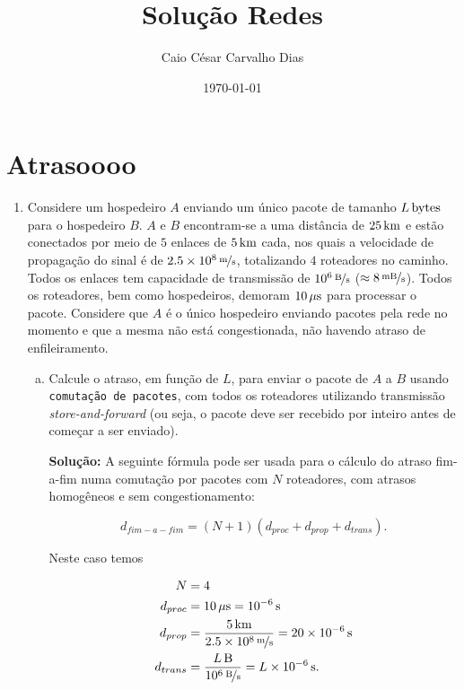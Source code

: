 \documentclass{article}
\title{Solução Redes}
\author{Caio César Carvalho Dias}
\date{\today}
\begin{document}
\maketitle

\section*{Atrasoooo}
\begin{enumerate}
\item 
Considere um hospedeiro $A$ enviando um único pacote de tamanho $\unit[L]{bytes}$ para o hospedeiro $B$. $A$ e $B$ encontram-se a uma distância de $\unit[25]{km}$ e estão conectados por meio de $5$ enlaces de $\unit[5]{km}$ cada, nos quais a velocidade de propagação do sinal é de $\unitfrac[2.5 \times 10^8]{m}{s}$, totalizando $4$ roteadores no caminho. Todos os enlaces tem capacidade de transmissão de $\unitfrac[10^6]{B}{s}$ ($\approx \unitfrac[8]{mB}{s}$). Todos os roteadores, bem como hospedeiros, demoram $\unit[10]{\mu s}$ para processar o pacote. Considere que $A$ é o único hospedeiro enviando pacotes pela rede no momento e que a mesma não está congestionada, não havendo atraso de enfileiramento.

\begin{enumerate}[a)]
\item Calcule o atraso, em função de $L$, para enviar o pacote de $A$ a $B$ usando \texttt{comutação de pacotes}, com todos os roteadores utilizando transmissão \textit{store-and-forward} (ou seja, o pacote deve ser recebido por inteiro antes de começar a ser enviado).

\begin{addmargin}[0.5in]{0.5in}
\par \textbf{Solução:} A seguinte fórmula pode ser usada para o cálculo do atraso fim-a-fim numa comutação por pacotes com $N$ roteadores, com atrasos homogêneos e sem congestionamento:

$$d_{fim-a-fim} = (N + 1)(d_{proc} + d_{prop} + d_{trans}).$$

Neste caso temos

\begin{equation} \label{eq1}
\begin{split}
N & = 4 \\
d_{proc} & = \unit[10]{\mu s} = \unit[10^{-6}]{s}\\
d_{prop} & = \frac{\unit[5]{km}}{\unitfrac[2.5 \times 10^8]{m}{s}} = \unit[20 \times 10^{-6}]{s}\\
d_{trans} & = \frac{\unit[L]{B}}{\unitfrac[10^6]{B}{s}} = \unit[L \times 10^{-6}]{s}.
\end{split}
\end{equation}


\end{addmargin}
\end{enumerate}
\end{enumerate}
\end{document}

